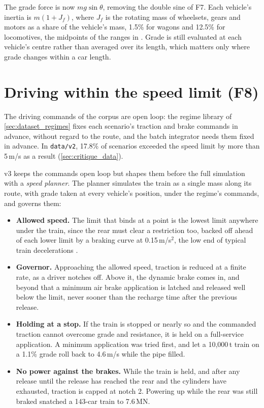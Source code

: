 The grade force is now $mg\sin\theta$, removing the double sine of F7. Each vehicle's inertia is $m(1 + J_f)$, where $J_f$ is the rotating mass of wheelsets, gears and motors as a share of the vehicle's mass, 1.5\% for wagons and 12.5\% for locomotives, the midpoints of the ranges in \cite[p.~459]{Cole2019HandbookLTD}. Grade is still evaluated at each vehicle's centre rather than averaged over its length, which matters only where grade changes within a car length.

\section{Driving within the speed limit (F8)}
\label{sec:v3_planner}

The driving commands of the corpus are open loop: the regime library of \cref{sec:dataset_regimes} fixes each scenario's traction and brake commands in advance, without regard to the route, and the batch integrator needs them fixed in advance. In \texttt{data/v2}, 17.8\% of scenarios exceeded the speed limit by more than 5\,m/s as a result (\cref{sec:critique_data}).

v3 keeps the commands open loop but shapes them before the full simulation with a \emph{speed planner}. The planner simulates the train as a single mass along its route, with grade taken at every vehicle's position, under the regime's commands, and governs them:

\begin{itemize}
    \item \textbf{Allowed speed.} The limit that binds at a point is the lowest limit anywhere under the train, since the rear must clear a restriction too, backed off ahead of each lower limit by a braking curve at 0.15\,m/s$^2$, the low end of typical train decelerations \cite[p.~515]{Cole2019HandbookLTD}.
    \item \textbf{Governor.} Approaching the allowed speed, traction is reduced at a finite rate, as a driver notches off. Above it, the dynamic brake comes in, and beyond that a minimum air brake application is latched and released well below the limit, never sooner than the recharge time after the previous release.
    \item \textbf{Holding at a stop.} If the train is stopped or nearly so and the commanded traction cannot overcome grade and resistance, it is held on a full-service application. A minimum application was tried first, and let a 10,000\,t train on a 1.1\% grade roll back to 4.6\,m/s while the pipe filled.
    \item \textbf{No power against the brakes.} While the train is held, and after any release until the release has reached the rear and the cylinders have exhausted, traction is capped at notch 2. Powering up while the rear was still braked snatched a 143-car train to 7.6\,MN.
\end{itemize}

